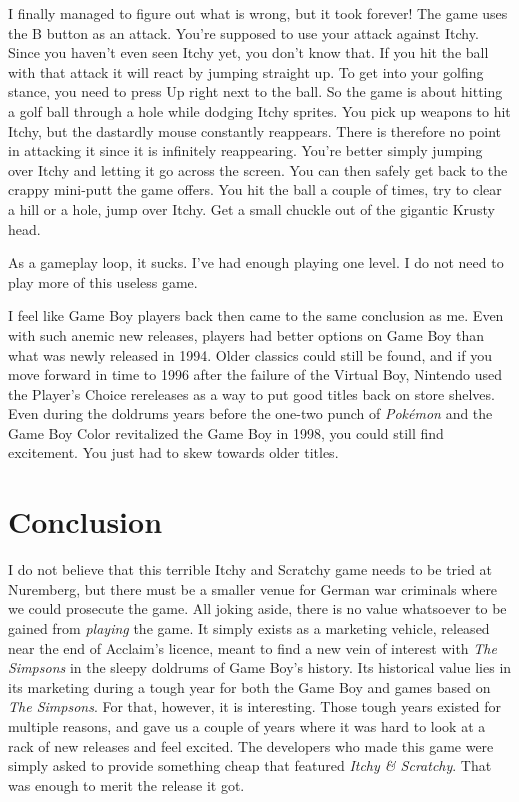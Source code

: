 \documentclass{book}
\begin{document}
I finally managed to figure out what is wrong, but it took forever! The game uses the B button as an attack. You’re supposed to use your attack against Itchy. Since you haven’t even seen Itchy yet, you don’t know that. If you hit the ball with that attack it will react by jumping straight up. To get into your golfing stance, you need to press Up right next to the ball. So the game is about hitting a golf ball through a hole while dodging Itchy sprites. You pick up weapons to hit Itchy, but the dastardly mouse constantly reappears. There is therefore no point in attacking it since it is infinitely reappearing. You’re better simply jumping over Itchy and letting it go across the screen. You can then safely get back to the crappy mini-putt the game offers. You hit the ball a couple of times, try to clear a hill or a hole, jump over Itchy. Get a small chuckle out of the gigantic Krusty head.\par
\FloatBarrier\vspace{\baselineskip}\begin{figure}[H]\end{figure}
As a gameplay loop, it sucks. I’ve had enough playing one level. I do not need to play more of this useless game.\par
I feel like Game Boy players back then came to the same conclusion as me. Even with such anemic new releases, players had better options on Game Boy than what was newly released in 1994. Older classics could still be found, and if you move forward in time to 1996 after the failure of the Virtual Boy, Nintendo used the Player’s Choice rereleases as a way to put good titles back on store shelves. Even during the doldrums years before the one-two punch of \emph{Pokémon} and the Game Boy Color revitalized the Game Boy in 1998, you could still find excitement. You just had to skew towards older titles.\par
\FloatBarrier\section*{Conclusion}
I do not believe that this terrible Itchy and Scratchy game needs to be tried at Nuremberg, but there must be a smaller venue for German war criminals where we could prosecute the game. All joking aside, there is no value whatsoever to be gained from \emph{playing} the game. It simply exists as a marketing vehicle, released near the end of Acclaim’s licence, meant to find a new vein of interest with \emph{The Simpsons} in the sleepy doldrums of Game Boy’s history. Its historical value lies in its marketing during a tough year for both the Game Boy and games based on \emph{The Simpsons}. For that, however, it is interesting. Those tough years existed for multiple reasons, and gave us a couple of years where it was hard to look at a rack of new releases and feel excited. The developers who made this game were simply asked to provide something cheap that featured \emph{Itchy \& Scratchy}. That was enough to merit the release it got.\par
\end{document}
